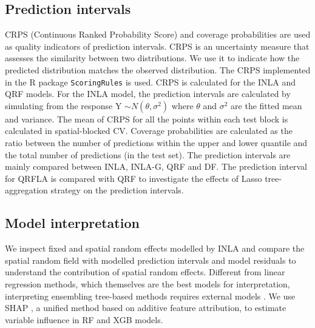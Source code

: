 \documentclass{article}
\begin{document}
\subsection {Prediction intervals}
CRPS (Continuous Ranked Probability Score) and coverage probabilities are used as quality indicators of prediction intervals. CRPS is an uncertainty measure that assesses the similarity between two distributions.  We use it to indicate how the predicted distribution matches the observed distribution. The CRPS implemented in the R package {\tt ScoringRules} \citep{jordan2017evaluating} is used. CRPS is calculated for the INLA and QRF models. For the INLA model, the prediction intervals are calculated by simulating from the response Y $\sim N(\theta, \sigma^2)$ where $\theta$ and $\sigma^2$ are the fitted mean and variance. The mean of CRPS for all the points within each test block is calculated in spatial-blocked CV. Coverage probabilities are calculated as the ratio between the number of predictions within the upper and lower quantile and the total number of predictions (in the test set). The prediction intervals are mainly compared between INLA, INLA-G, QRF and DF. The prediction interval for QRFLA is compared with QRF to investigate the effects of Lasso tree-aggregation strategy on the prediction intervals.
 
\subsection{Model interpretation}
We inspect fixed and spatial random effects modelled by INLA and compare the spatial random field with modelled prediction intervals and model residuals to understand the contribution of spatial random effects. Different from linear regression methods, which themselves are the best models for interpretation, interpreting ensembling tree-based methods requires external models \citep{NIPS2017_8a20a862}. We use SHAP \citep[SHapley Additive exPlanations,][]{lundberg2018explainable,NIPS2017_8a20a862}, a unified method based on additive feature attribution, to estimate variable influence in RF and XGB models.   
\end{document}
